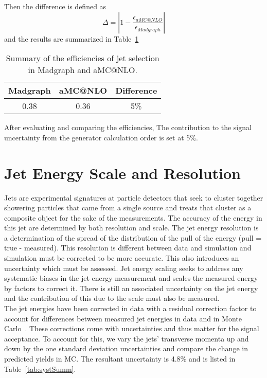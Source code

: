 Then the difference is defined as
\begin{equation}
\Delta = | 1 - \frac{\epsilon _{aMC@NLO}}{\epsilon _{Madgraph}} |
\end{equation}
and the results are summarized in Table~\ref{tab:systgeneratorsum}

\begin{table}[h]
\begin{center}
\caption{\small\label{tab:systgeneratorsum} Summary of the efficiencies of jet selection in Madgraph and aMC@NLO.}
\begin{tabular}{ccc}\hline
Madgraph           &  aMC@NLO & Difference \\ \hline
0.38                      & 0.36              & 5\%\\
\hline
\end{tabular}
\end{center}
\end{table}

After evaluating and comparing the efficiencies, The contribution to the signal uncertainty from the generator calculation order is set at 5\%.

\section{Jet Energy Scale and Resolution}
Jets are experimental signatures at particle detectors that seek to cluster together showering particles that came from a single source and treats that cluster as a composite object for the sake of the measurements. The accuracy of the energy in this jet are determined by both resolution and scale. The jet energy resolution is a determination of the spread of the distribution of the pull of the energy (pull = true - measured). This resolution is different between data and simulation and simulation must be corrected to be more accurate. This also introduces an uncertainty which must be assessed. Jet energy scaling seeks to address any systematic biases in the jet energy measurement and scales the measured energy by factors to correct it. There is still an associated uncertainty on the jet energy and the contribution of this due to the scale must also be measured.\\

The jet energies have been corrected in data with a residual correction factor to account for differences between measured jet energies in data and in Monte Carlo~\cite{jes_ref}. These corrections come with uncertainties and thus matter for the signal acceptance. To account for this, we vary the jets' transverse momenta up and down by the one standard deviation uncertainties and compare the change in predicted yields in MC. The resultant uncertainty is 4.8\% and is listed in Table~\ref{tab:systSumm}.\\

